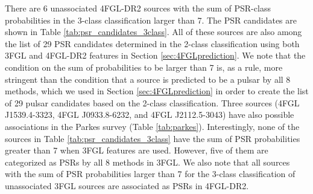 There are 6 unassociated 4FGL-DR2 sources
with the sum of PSR-class probabilities in the 3-class classification larger than 7.
The PSR candidates are shown in Table \ref{tab:psr_candidates_3class}. 
All of these sources are also among the list of 29 PSR candidates determined in the 2-class classification using both 3FGL and 4FGL-DR2 
features in Section \ref{sec:4FGLprediction}. 
We note that the condition on the sum of probabilities to be larger than 7 is, as a rule, more stringent than the condition that a source
is predicted to be a pulsar by all 8 methods, which we used in Section \ref{sec:4FGLprediction} in order to create the list of 29 pulsar
candidates based on the 2-class classification.
Three sources (4FGL J1539.4-3323, 4FGL J0933.8-6232,  and 4FGL J2112.5-3043) 
have also possible associations in the Parkes survey (Table \ref{tab:parkes}).
Interestingly, none of the sources in Table \ref{tab:psr_candidates_3class} have the sum of PSR probabilities greater than 7 when 3FGL features are used. However, five of them are categorized as PSRs by all 8 methods in 3FGL. %
We also note that all sources with the sum of PSR probabilities larger than 7 for the 3-class classification of unassociated 3FGL sources
are associated as PSRs in 4FGL-DR2.

